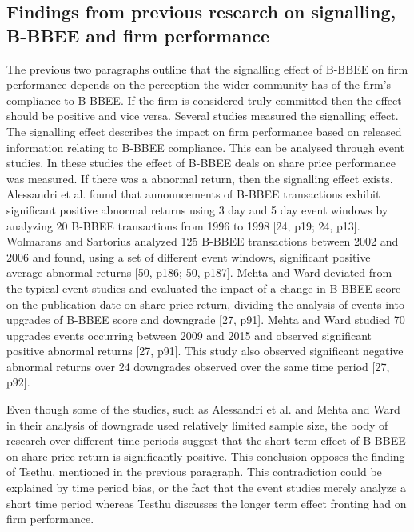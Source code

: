 \subsection{Findings from previous research on signalling, B-BBEE and firm performance}
The previous two paragraphs outline that the signalling effect of B-BBEE on firm performance depends on the perception the wider community has of the firm’s compliance to B-BBEE. If the firm is considered truly committed then the effect should be positive and vice versa. Several studies measured the signalling effect. The signalling effect describes the impact on firm performance based on released information relating to B-BBEE compliance. This can be analysed through event studies. In these studies the effect of B-BBEE deals on share price performance was measured. If there was a abnormal return, then the signalling effect exists. Alessandri et al. found that announcements of B-BBEE transactions exhibit significant positive abnormal returns using 3 day and 5 day event windows by analyzing 20 B-BBEE transactions from 1996 to 1998 [24, p19; 24, p13]. Wolmarans and Sartorius analyzed 125 B-BBEE transactions between 2002 and 2006 and found, using a set of different event windows, significant positive average abnormal returns [50, p186; 50, p187]. Mehta and Ward deviated from the typical event studies and evaluated the impact of a change in B-BBEE score on the publication date on share price return, dividing the analysis of events into upgrades of B-BBEE score and downgrade [27, p91]. Mehta and Ward studied 70 upgrades events occurring between 2009 and 2015 and observed significant positive abnormal returns [27, p91]. This study also observed significant negative abnormal returns over 24 downgrades observed over the same time period [27, p92].

Even though some of the studies, such as Alessandri et al. and Mehta and Ward in their analysis of downgrade used relatively limited sample size, the body of research over different time periods suggest that the short term effect of B-BBEE on share price return is significantly positive. This conclusion opposes the finding of Tsethu, mentioned in the previous paragraph. This contradiction could be explained by time period bias, or the fact that the event studies merely analyze a short time period whereas Testhu discusses the longer term effect fronting had on firm performance.


